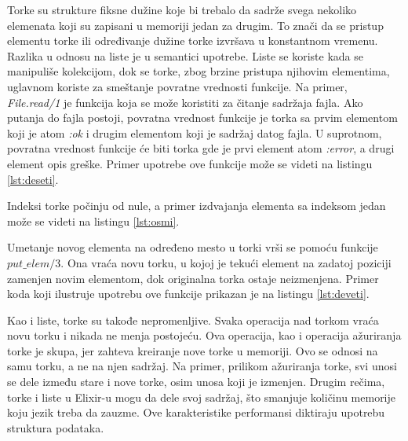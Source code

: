 \documentclass[12pt,oneside]{memoir}
\begin{document}


Torke su strukture fiksne dužine koje bi trebalo da sadrže svega nekoliko elemenata koji su zapisani u memoriji jedan za drugim. To znači da se pristup elementu torke ili određivanje dužine torke izvršava u konstantnom vremenu. Razlika u odnosu na liste je u semantici upotrebe. Liste se koriste kada se manipuliše kolekcijom, dok se torke, zbog brzine pristupa njihovim elementima, uglavnom koriste za smeštanje povratne vrednosti funkcije. Na primer, \textit{File.read/1} je funkcija koja se može koristiti za čitanje sadržaja fajla. Ako putanja do fajla postoji, povratna vrednost funkcije je torka sa prvim elementom koji je atom \textit{:ok} i drugim elementom koji je sadržaj datog fajla. U suprotnom, povratna vrednost funkcije će biti torka gde je prvi element atom \textit{:error}, a drugi element opis greške. Primer upotrebe ove funkcije može se videti na listingu \ref{lst:deseti}.



Indeksi torke počinju od nule, a primer izdvajanja elementa sa indeksom jedan može se videti na listingu \ref{lst:osmi}.



Umetanje novog elementa na određeno mesto u torki vrši se pomoću funkcije $put\_elem/3$. Ona vraća novu torku, u kojoj je tekući element na zadatoj poziciji zamenjen novim elementom, dok originalna torka ostaje neizmenjena. Primer koda koji ilustruje upotrebu ove funkcije prikazan je na listingu \ref{lst:deveti}.



Kao i liste, torke su takođe nepromenljive. Svaka operacija nad torkom vraća novu torku i nikada ne menja postojeću. Ova operacija, kao i operacija ažuriranja torke je skupa, jer zahteva kreiranje nove torke u memoriji. Ovo se odnosi na samu torku, a ne na njen sadržaj. Na primer, prilikom ažuriranja torke, svi unosi se dele između stare i nove torke, osim unosa koji je izmenjen. Drugim rečima, torke i liste u Elixir-u mogu da dele svoj sadržaj, što smanjuje količinu memorije koju jezik treba da zauzme. Ove karakteristike performansi diktiraju upotrebu struktura podataka. 
\end{document}

